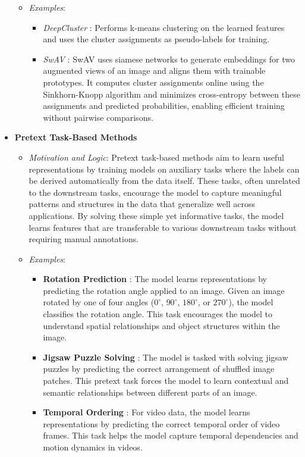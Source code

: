 \begin{itemize}
\begin{itemize}
        \item \emph{Examples}:
        \begin{itemize}
            \item \emph{DeepCluster} \citep{caron2018deep}: Performs k-means clustering on the learned features and uses the cluster assignments as pseudo-labels for training.
            \item \emph{SwAV} \citep{caron2020unsupervised}: SwAV uses siamese networks to generate embeddings for two augmented views of an image and aligns them with trainable prototypes. It computes cluster assignments online using the Sinkhorn-Knopp algorithm and minimizes cross-entropy between these assignments and predicted probabilities, enabling efficient training without pairwise comparisons.
        \end{itemize}
    \end{itemize}
    \item \textbf{Pretext Task-Based Methods}
    \begin{itemize}
         \item \emph{Motivation and Logic}: Pretext task-based methods aim to learn useful representations by training models on auxiliary tasks where the labels can be derived automatically from the data itself. These tasks, often unrelated to the downstream tasks, encourage the model to capture meaningful patterns and structures in the data that generalize well across applications. By solving these simple yet informative tasks, the model learns features that are transferable to various downstream tasks without requiring manual annotations.

    \item \emph{Examples}:
    \begin{itemize}
        \item \textbf{Rotation Prediction} \citep{gidaris2018unsupervised}: The model learns representations by predicting the rotation angle applied to an image. Given an image rotated by one of four angles (\(0^\circ\), \(90^\circ\), \(180^\circ\), or \(270^\circ\)), the model classifies the rotation angle. This task encourages the model to understand spatial relationships and object structures within the image.

        \item \textbf{Jigsaw Puzzle Solving} \citep{noroozi2016unsupervised}: The model is tasked with solving jigsaw puzzles by predicting the correct arrangement of shuffled image patches. This pretext task forces the model to learn contextual and semantic relationships between different parts of an image.
        
        \item \textbf{Temporal Ordering} \citep{misra2016shuffle}: For video data, the model learns representations by predicting the correct temporal order of video frames. This task helps the model capture temporal dependencies and motion dynamics in videos.
    \end{itemize}
    \end{itemize}

\end{itemize}


